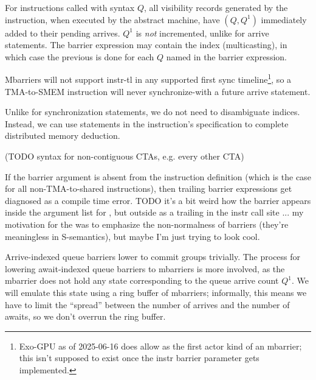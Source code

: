 \filbreak
{}

For instructions called with syntax  $Q$, all visibility records generated by the instruction, when executed by the abstract machine, have $(Q, Q^1)$ immediately added to their pending arrives.
$Q^1$ is \textit{not} incremented, unlike for arrive statements.
The barrier expression may contain the \lighttt{:} index (multicasting), in which case the previous is done for each $Q$ named in the barrier expression.

\filbreak
Mbarriers will not support  instr-tl in any supported first sync timeline\footnote{Exo-GPU as of 2025-06-16 does allow  as the first actor kind of an mbarrier; this isn't supposed to exist once the instr barrier parameter gets implemented.}, so a TMA-to-SMEM instruction will never synchronize-with a future arrive statement.

\filbreak
{}

Unlike for synchronization statements, we do not need to disambiguate \lighttt{:} indices.
Instead, we can use  statements in the instruction's  specification to complete distributed memory deduction.



(TODO syntax for non-contiguous CTAs, e.g. every other CTA)

\filbreak
If the barrier argument is absent from the instruction definition (which is the case for all non-TMA-to-shared instructions), then trailing barrier expressions get diagnosed as a compile time error.
TODO it's a bit weird how the barrier appears inside the argument list for , but outside as a trailing  in the instr call site ... my motivation for the \lighttt{>>} was to emphasize the non-normalness of barriers (they're meaningless in S-semantics), but maybe I'm just trying to look cool.

\newpage
{}
\label{ch:mbarrier}

Arrive-indexed queue barriers lower to commit groups trivially.
The process for lowering await-indexed queue barriers to mbarriers is more involved, as the mbarrier does not hold any state corresponding to the queue arrive count $Q^1$.
We will emulate this state using a ring buffer of mbarriers; informally, this means we have to limit the ``spread'' between the number of arrives and the number of awaits, so we don't overrun the ring buffer.

